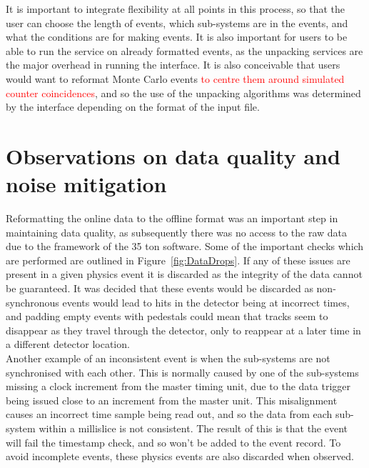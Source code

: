 It is important to integrate flexibility at all points in this process, so that the user can choose the length of events, which sub-systems are in the events, and what the conditions are for making events. It is also important for users to be able to run the service on already formatted events, as the unpacking services are the major overhead in running the interface. It is also conceivable that users would want to reformat Monte Carlo events \textcolor{red}{to centre them around simulated counter coincidences}, and so the use of the unpacking algorithms was determined by the interface depending on the format of the input file.

\section{Observations on data quality and noise mitigation} \label{sec:AllTheNoise} %
Reformatting the online data to the offline format was an important step in maintaining data quality, as subsequently there was no access to the raw data due to the framework of the 35 ton software. Some of the important checks which are performed are outlined in Figure~\ref{fig:DataDrops}. If any of these issues are present in a given physics event it is discarded as the integrity of the data cannot be guaranteed. It was decided that these events would be discarded as non-synchronous events would lead to hits in the detector being at incorrect times, and padding empty events with pedestals could mean that tracks seem to disappear as they travel through the detector, only to reappear at a later time in a different detector location. \\

Another example of an inconsistent event is when the sub-systems are not synchronised with each other. This is normally caused by one of the sub-systems missing a clock increment from the master timing unit, due to the data trigger being issued close to an increment from the master unit. This misalignment causes an incorrect time sample being read out, and so the data from each sub-system within a millislice is not consistent. The result of this is that the event will fail the timestamp check, and so won't be added to the event record. To avoid incomplete events, these physics events are also discarded when observed. \\

